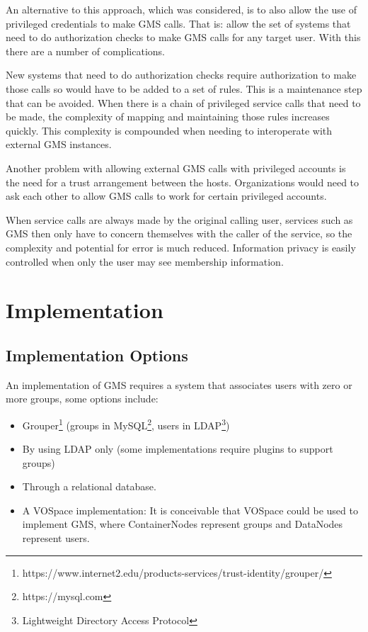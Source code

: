 \documentclass[11pt,a4paper]{ivoa}
\begin{document}
An alternative to this approach, which was considered, is to also allow the use of privileged credentials to make GMS calls.  That is: allow the set of systems that need to do authorization checks to make GMS calls for any target user.  With this there are a number of complications.

New systems that need to do authorization checks require authorization to make those calls so would have to be added to a set of rules.  This is a maintenance step that can be avoided.  When there is a chain of privileged service calls that need to be made, the complexity of mapping and maintaining those rules increases quickly.  This complexity is compounded when needing to interoperate with external GMS instances.

Another problem with allowing external GMS calls with privileged accounts is the need for a trust arrangement between the hosts.  Organizations would need to ask each other to allow GMS calls to work for certain privileged accounts.

When service calls are always made by the original calling user, services such as GMS then only have to concern themselves with the caller of the service, so the complexity and potential for error is much reduced.  Information privacy is easily controlled when only the user may see membership information.

\section {Implementation}

\subsection {Implementation Options}
\label{subsec:implopts}

An implementation of GMS requires a system that associates users with zero or more groups, some options include:

\begin{itemize}
\item Grouper\footnote{https://www.internet2.edu/products-services/trust-identity/grouper/} (groups in MySQL\footnote{https://mysql.com}, users in LDAP\footnote{Lightweight Directory Access Protocol})
\item By using LDAP only (some implementations require plugins to support groups)
\item Through a relational database.
\item A VOSpace implementation: It is conceivable that VOSpace could be used to implement GMS, where ContainerNodes represent groups and DataNodes represent users.
\end{itemize}
\end{document}
